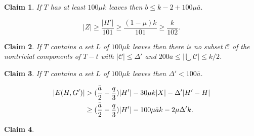 \documentclass[10pt,a4paper]{amsart}
\newtheorem{claim}{Claim}
\begin{document}
                 \begin{claim}\label{avdegH'toH'cupX}
If $T$ has at least $100\mu k$ leaves then  $b\le k-2+100\mu \bar a.$
          \end{claim}

    \begin{equation}\label{ZZZZ}
    |Z| \ge \frac{|H'|}{101} \ge \frac{(1-\mu) k}{101} \ge \frac{k}{102}.
   \end{equation}

               \begin{claim}\label{notcase2.1'}
     If $T$ contains a set $L$ of  $100\mu k$ leaves 
     then   there is no subset $\mathcal C$ of the nontrivial components of
     $T-t$ with $|\mathcal C|\le \Delta'$ and $200\bar a\le |\bigcup \mathcal C|\le k/2$.
         \end{claim}

               \begin{claim}\label{notcase2.1}
     If $T$ contains a set $L$ of  $100\mu k$ leaves then  $\Delta'< 100\bar a$. 
         \end{claim}

   \begin{align}\label{EHG'2}
  |E(H, G')| &> (\frac{\bar a}2 -\frac q3) |H'| -30 \mu k|X|-\Delta' |H'-H| \notag \\ & \ge (\frac{\bar a}2 -\frac q3) |H'| -100 \mu \bar a  k   -2\mu \Delta' k. \end{align}  

              \begin{claim}\label{Tatmost200leaves}
          \end{claim}     
\end{document}
